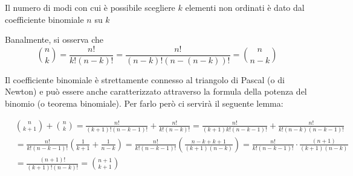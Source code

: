 \documentclass{report}
\begin{document}
Il numero di modi con cui è possibile scegliere  $k$ elementi non ordinati è dato dal coefficiente binomiale $n$ su $k$
\begin{myproof}
	Banalmente, si osserva che
	$$
		\binom{n}{k} = \frac{n!}{k!(n-k)!} = \frac{n!}{(n-k)!(n-(n-k))!} = \binom{n}{n-k}
	$$
\end{myproof}
\noindent Il coefficiente binomiale è strettamente connesso al triangolo di Pascal (o di Newton) e può essere anche caratterizzato attraverso la formula della potenza del binomio (o teorema binomiale). Per farlo però ci servirà il seguente lemma:
\begin{myproof}
	\begin{align*}
		&\binom{n}{k+1} + \binom{n}{k} = \frac{n!}{(k+1)!(n-k-1)!} + \frac{n!}{k!(n-k)!} = \frac{n!}{(k+1)k!(n-k-1)!} + \frac{n!}{k!(n-k)(n-k-1)!} \\ &= \frac{n!}{k!(n-k-1)!} \left( \frac{1}{k+1} + \frac{1}{n-k} \right) = \frac{n!}{k!(n-k-1)!} \left( \frac{n -k + k + 1}{(k+1)(n-k)} \right) = \frac{n!}{k!(n-k-1)!} \cdot \frac{(n+1)}{(k+1)(n-k)} \\ &= \frac{(n+1)!}{(k+1)!(n-k)!} = \binom{n+1}{k+1}
	\end{align*}
\end{myproof}
\end{document}
